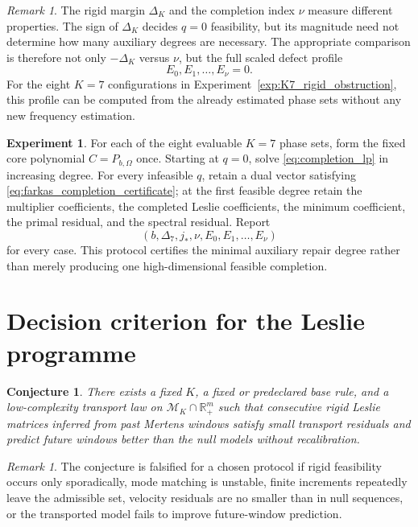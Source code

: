 \documentclass[11pt]{amsart}
\numberwithin{equation}{section}
\theoremstyle{plain}
\newtheorem{conjecture}[theorem]{Conjecture}
\theoremstyle{definition}
\newtheorem{experiment}[theorem]{Experiment}
\theoremstyle{remark}
\newtheorem{remark}[theorem]{Remark}
\begin{document}
\begin{remark}
\label{rem:delta_vs_nu}
The rigid margin $\Delta_K$ and the completion index $\nu$ measure different properties.  The sign of $\Delta_K$ decides $q=0$ feasibility, but its magnitude need not determine how many auxiliary degrees are necessary.  The appropriate comparison is therefore not only $-\Delta_K$ versus $\nu$, but the full scaled defect profile
\[
E_0,E_1,\ldots,E_{\nu}=0.
\]
For the eight $K=7$ configurations in Experiment~\ref{exp:K7_rigid_obstruction}, this profile can be computed from the already estimated phase sets without any new frequency estimation.
\end{remark}

\begin{experiment}
\label{exp:minimal_auxiliary_protocol}
For each of the eight evaluable $K=7$ phase sets, form the fixed core polynomial $C=P_{b,\Omega}$ once.  Starting at $q=0$, solve \eqref{eq:completion_lp} in increasing degree.  For every infeasible $q$, retain a dual vector satisfying \eqref{eq:farkas_completion_certificate}; at the first feasible degree retain the multiplier coefficients, the completed Leslie coefficients, the minimum coefficient, the primal residual, and the spectral residual.  Report
\[
(b,\Delta_7,j_*,\nu,E_0,E_1,\ldots,E_\nu)
\]
for every case.  This protocol certifies the minimal auxiliary repair degree rather than merely producing one high-dimensional feasible completion.
\end{experiment}


\section{Decision criterion for the Leslie programme}
\label{sec:decision_criterion}

\begin{conjecture}
\label{conj:transportable_trajectory}
There exists a fixed $K$, a fixed or predeclared base rule, and a low-complexity transport law on $\mathcal M_K\cap\mathbb R_+^m$ such that consecutive rigid Leslie matrices inferred from past Mertens windows satisfy small transport residuals and predict future windows better than the null models without recalibration.
\end{conjecture}

\begin{remark}
\label{rem:falsification}
The conjecture is falsified for a chosen protocol if rigid feasibility occurs only sporadically, mode matching is unstable, finite increments repeatedly leave the admissible set, velocity residuals are no smaller than in null sequences, or the transported model fails to improve future-window prediction.
\end{remark}
\end{document}
